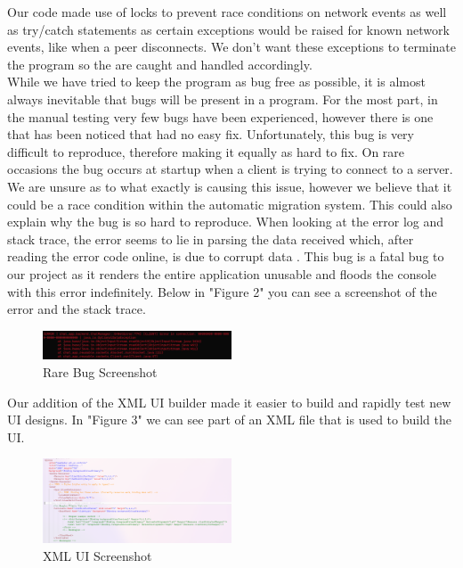 \documentclass{COMPXXXX}
\begin{document}
\normalsize \textrm {Our code made use of locks to prevent race conditions on network events as well as try/catch statements as certain exceptions would be raised for known network events, like when a peer disconnects. We don't want these exceptions to terminate the program so the are caught and handled accordingly.\\
While we have tried to keep the program as bug free as possible, it is almost always inevitable that bugs will be present in a program. For the most part, in the manual testing very few bugs have been experienced, however there is one that has been noticed that had no easy fix. Unfortunately, this bug is very difficult to reproduce, therefore making it equally as hard to fix. On rare occasions the bug occurs at startup when a client is trying to connect to a server. We are unsure as to what exactly is causing this issue, however we believe that it could be a race condition within the automatic migration system. This could also explain why the bug is so hard to reproduce. When looking at the error log and stack trace, the error seems to lie in parsing the data received which, after reading the error code online, is due to corrupt data \cite{streamcorruptedexception_invalid_type_code_ac}. This bug is a fatal bug to our project as it renders the entire application unusable and floods the console with this error indefinitely. Below in "Figure 2" you can see a screenshot of the error and the stack trace.}
\begin{figure}[h]
\centering
\includegraphics[width=0.5\textwidth]{rare_bug.png}
\caption{Rare Bug Screenshot}
\label{fig:figure2}
\end{figure}

\normalsize \textrm {Our addition of the XML UI builder made it easier to build and rapidly test new UI designs. In "Figure 3" we can see part of an XML file that is used to build the UI.}
\begin{figure}[h]
\centering
\includegraphics[width=0.5\textwidth]{xml_ui.png}
\caption{XML UI Screenshot}
\label{fig:figure3}
\end{figure}
\end{document}
